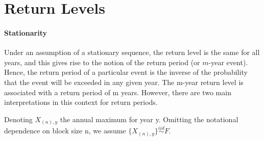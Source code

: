 \documentclass[11pt,a4paper,openany ]{book}
\begin{document}
\section{Return Levels}


\paragraph{ Stationarity} Under an assumption of a
stationary sequence, the return level is the same for all years, and this gives rise to the notion
of the return period (or $m$-year event). Hence, the return period of a particular event is the
inverse of the probability that the event will be exceeded in any given year. The m-year return level is associated with a return period of m years. However, there are two main interpretations in this context for return periods.

\cite[pp.100]{aghakouchak_extremes_2013-1}

Denoting $X_{(n),y}$ the annual maximum for year y. Omitting the notational dependence on block size n, we assume $\{X_{(n),y}\}\stackrel{iid}{\sim}F$. 
\end{document}
